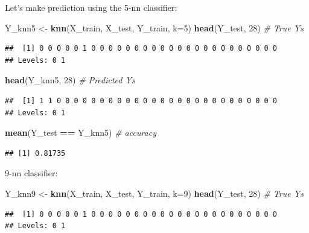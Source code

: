 \documentclass[10pt,b5paper,krantz1]{krantz}
\newenvironment{Shaded}{\begin{snugshade}}{\end{snugshade}}
\newcommand{\CommentTok}[1]{\textcolor[rgb]{0.37,0.37,0.37}{\textit{#1}}}
\newcommand{\DataTypeTok}[1]{\textcolor[rgb]{0.27,0.27,0.27}{#1}}
\newcommand{\DecValTok}[1]{\textcolor[rgb]{0.06,0.06,0.06}{#1}}
\newcommand{\KeywordTok}[1]{\textcolor[rgb]{0.27,0.27,0.27}{\textbf{#1}}}
\newcommand{\NormalTok}[1]{#1}
\newcommand{\OperatorTok}[1]{\textcolor[rgb]{0.43,0.43,0.43}{\textbf{#1}}}
\newcommand{\StringTok}[1]{\textcolor[rgb]{0.5,0.5,0.5}{#1}}
\begin{document}
Let's make prediction using the 5-nn classifier:

\begin{Shaded}
\begin{Highlighting}[]
\NormalTok{Y_knn5 <-}\StringTok{ }\KeywordTok{knn}\NormalTok{(X_train, X_test, Y_train, }\DataTypeTok{k=}\DecValTok{5}\NormalTok{)}
\KeywordTok{head}\NormalTok{(Y_test, }\DecValTok{28}\NormalTok{) }\CommentTok{# True Ys}
\end{Highlighting}
\end{Shaded}

\begin{verbatim}
##  [1] 0 0 0 0 0 1 0 0 0 0 0 0 0 0 0 0 0 0 0 0 0 0 0 0 0 0 0 0
## Levels: 0 1
\end{verbatim}

\begin{Shaded}
\begin{Highlighting}[]
\KeywordTok{head}\NormalTok{(Y_knn5, }\DecValTok{28}\NormalTok{) }\CommentTok{# Predicted Ys}
\end{Highlighting}
\end{Shaded}

\begin{verbatim}
##  [1] 1 1 0 0 0 0 0 0 0 0 0 0 0 0 0 0 0 0 0 0 0 0 0 0 0 0 0 0
## Levels: 0 1
\end{verbatim}

\begin{Shaded}
\begin{Highlighting}[]
\KeywordTok{mean}\NormalTok{(Y_test }\OperatorTok{==}\StringTok{ }\NormalTok{Y_knn5) }\CommentTok{# accuracy}
\end{Highlighting}
\end{Shaded}

\begin{verbatim}
## [1] 0.81735
\end{verbatim}

9-nn classifier:

\begin{Shaded}
\begin{Highlighting}[]
\NormalTok{Y_knn9 <-}\StringTok{ }\KeywordTok{knn}\NormalTok{(X_train, X_test, Y_train, }\DataTypeTok{k=}\DecValTok{9}\NormalTok{)}
\KeywordTok{head}\NormalTok{(Y_test, }\DecValTok{28}\NormalTok{) }\CommentTok{# True Ys}
\end{Highlighting}
\end{Shaded}

\begin{verbatim}
##  [1] 0 0 0 0 0 1 0 0 0 0 0 0 0 0 0 0 0 0 0 0 0 0 0 0 0 0 0 0
## Levels: 0 1
\end{verbatim}
\end{document}
